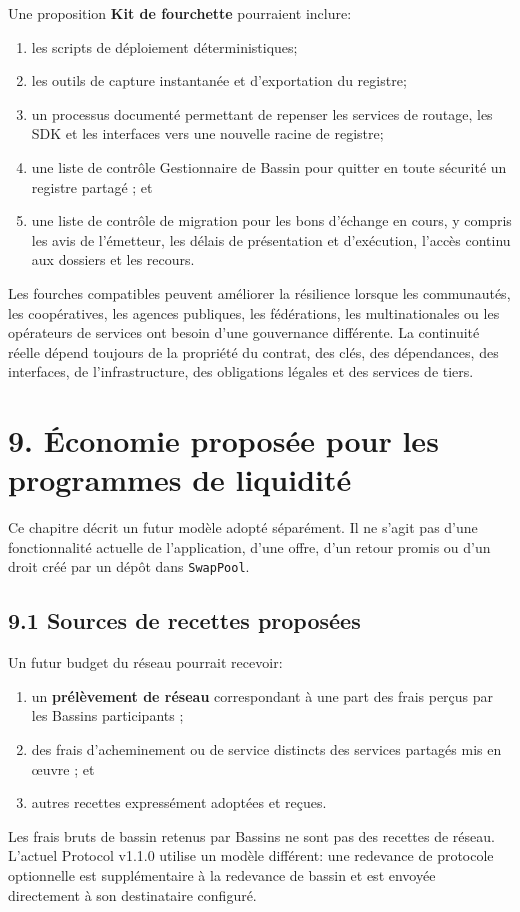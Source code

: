 \documentclass[11pt]{article}
\begin{document}
Une proposition \textbf{Kit de fourchette} pourraient inclure:

\begin{enumerate}[leftmargin=*]
\item les scripts de déploiement déterministiques;
\item les outils de capture instantanée et d'exportation du registre;
\item un processus documenté permettant de repenser les services de routage, les SDK et les interfaces vers une nouvelle racine de registre;
\item une liste de contrôle Gestionnaire de Bassin pour quitter en toute sécurité un registre partagé ; et
\item une liste de contrôle de migration pour les bons d'échange en cours, y compris les avis de l'émetteur, les délais de présentation et d'exécution, l'accès continu aux dossiers et les recours.
\end{enumerate}
Les fourches compatibles peuvent améliorer la résilience lorsque les communautés, les coopératives, les agences publiques, les fédérations, les multinationales ou les opérateurs de services ont besoin d'une gouvernance différente. La continuité réelle dépend toujours de la propriété du contrat, des clés, des dépendances, des interfaces, de l'infrastructure, des obligations légales et des services de tiers.


\section*{9. Économie proposée pour les programmes de liquidité}

Ce chapitre décrit un futur modèle adopté séparément. Il ne s'agit pas d'une fonctionnalité actuelle de l'application, d'une offre, d'un retour promis ou d'un droit créé par un dépôt dans \texttt{SwapPool}.

\subsection*{9.1 Sources de recettes proposées}

Un futur budget du réseau pourrait recevoir:

\begin{enumerate}[leftmargin=*]
\item un \textbf{prélèvement de réseau} correspondant à une part des frais perçus par les Bassins participants ;
\item des frais d'acheminement ou de service distincts des services partagés mis en œuvre ; et
\item autres recettes expressément adoptées et reçues.
\end{enumerate}
Les frais bruts de bassin retenus par Bassins ne sont pas des recettes de réseau. L'actuel Protocol v1.1.0 utilise un modèle différent: une redevance de protocole optionnelle est supplémentaire à la redevance de bassin et est envoyée directement à son destinataire configuré.
\end{document}
